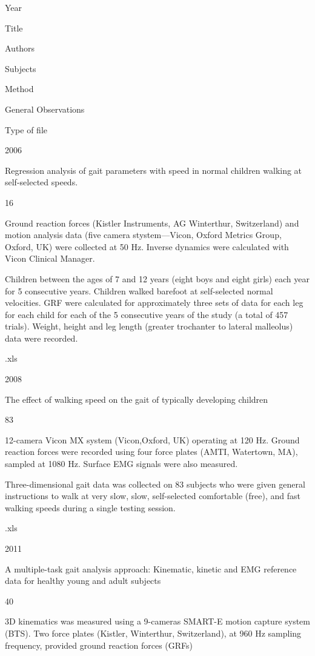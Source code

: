\documentclass[11pt]{article}
\begin{document}
    Year

Title

Authors

Subjects

Method

General Observations

Type of file

2006

Regression analysis of gait parameters with speed in normal children
walking at self-selected speeds.

\cite{Stansfield2006}

16

Ground reaction forces (Kistler Instruments, AG Winterthur, Switzerland)
and motion analysis data (five camera stystem---Vicon, Oxford Metrics
Group, Oxford, UK) were collected at 50 Hz. Inverse dynamics were
calculated with Vicon Clinical Manager.

Children between the ages of 7 and 12 years (eight boys and eight girls)
each year for 5 consecutive years. Children walked barefoot at
self-selected normal velocities. GRF were calculated for approximately
three sets of data for each leg for each child for each of the 5
consecutive years of the study (a total of 457 trials). Weight, height
and leg length (greater trochanter to lateral malleolus) data were
recorded.

.xls

2008

The effect of walking speed on the gait of typically developing children

\cite{Schwartz2008}

83

12-camera Vicon MX system (Vicon,Oxford, UK) operating at 120 Hz. Ground
reaction forces were recorded using four force plates (AMTI, Watertown,
MA), sampled at 1080 Hz. Surface EMG signals were also measured.

Three-dimensional gait data was collected on 83 subjects who were given
general instructions to walk at very slow, slow, self-selected
comfortable (free), and fast walking speeds during a single testing
session.

.xls

2011

A multiple-task gait analysis approach: Kinematic, kinetic and EMG
reference data for healthy young and adult subjects

\cite{Bovi2011a}

40

3D kinematics was measured using a 9-cameras SMART-E motion capture
system (BTS). Two force plates (Kistler, Winterthur, Switzerland), at
960 Hz sampling frequency, provided ground reaction forces (GRFs)
\end{document}

